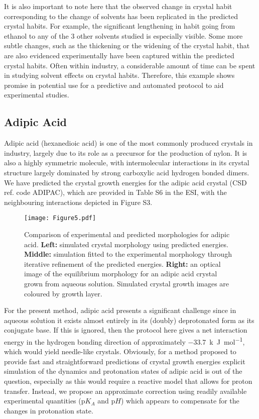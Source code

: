\documentclass[twoside,twocolumn,9pt]{article}
\begin{document}
It is also important to note here that the observed change in crystal habit corresponding to the change of solvents has been replicated in the predicted crystal habits. For example, the significant lengthening in habit going from ethanol to any of the 3 other solvents studied is especially visible. Some more subtle changes, such as the thickening or the widening of the crystal habit, that are also evidenced experimentally have been captured within the predicted crystal habits.
Often within industry, a considerable amount of time can be spent in studying solvent effects on crystal habits. Therefore, this example shows promise in potential use for a predictive and automated protocol to aid experimental studies. 

\subsection{Adipic Acid}

Adipic acid (hexanedioic acid) is one of the most commonly produced crystals in industry, largely due
to its role as a precursor for the production of nylon. It is also a highly symmetric molecule,
with intermolecular interactions in its crystal structure largely dominated by strong carboxylic acid hydrogen bonded dimers. We have predicted the crystal growth energies for the adipic acid crystal (CSD ref. code ADIPAC), which are provided in Table S6 in the ESI, with the neighbouring interactions depicted in Figure S3. 

\begin{figure*}
\centering
  \texttt{[image: Figure5.pdf]}
  \caption{Comparison of experimental and predicted morphologies for adipic acid. \textbf{Left:} simulated crystal morphology using predicted energies. \textbf{Middle:} simulation fitted to the experimental morphology through iterative refinement of the predicted energies. \textbf{Right:} an optical image of the equilibrium morphology for an adipic acid crystal grown from aqueous solution. Simulated crystal growth images are coloured by growth layer.}
  \label{fig:adipic}
\end{figure*}

For the present method, adipic acid presents a significant challenge since in aqueous solution it exists almost entirely in its (doubly) deprotonated form as its conjugate base. If this is ignored, then the protocol here gives a net interaction energy in the hydrogen bonding direction of approximately \qty{-33.7}{k.J.mol^{-1}}, 
which would yield needle-like crystals.
Obviously, for a method proposed to provide fast and straightforward predictions of crystal growth energies explicit simulation of the dynamics and protonation states of adipic acid is out of the question, especially as this would require a reactive model that allows for proton transfer. Instead, we propose an approximate correction using readily available experimental quantities ($\text{p}K_A$ and $\text{p}H$) which appears to compensate for the changes in protonation state.
\end{document}
